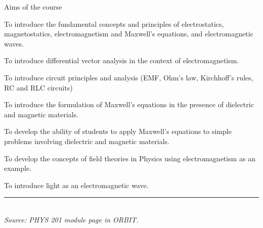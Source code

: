 %
%
%
%

%
%
%

\begin{frame}{Aims of the course}

\begin{itemize}
{\small
\item
To introduce the fundamental concepts and principles of electrostatics, magnetostatics,
electromagnetism and Maxwell's equations, and electromagnetic waves.
\item
To introduce differential vector analysis in the context of electromagnetism.
\item
To introduce circuit principles and analysis (EMF, Ohm's law, Kirchhoff's rules, RC and RLC circuits)
\item
To introduce the formulation of Maxwell's equations in the presence of dielectric and magnetic materials.
\item
To develop the ability of students to apply Maxwell's equations to simple problems involving dielectric and
magnetic materials.
\item
To develop the concepts of field theories in Physics using electromagnetism as an example.
\item
To introduce light as an electromagnetic wave.
}
\end{itemize}

\vspace{0.2cm}
\noindent\rule{2cm}{0.4pt}\\
{\it \scriptsize Source: PHYS 201 module page in ORBIT.}

\end{frame}

%
%

